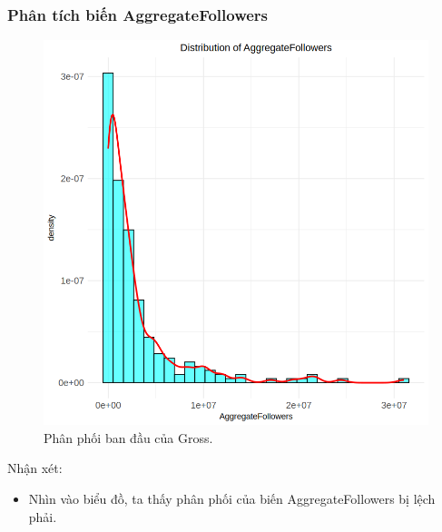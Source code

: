 \subsubsection{Phân tích biến AggregateFollowers}

\begin{figure}[H]
    \centering
    \includegraphics[width=0.75\columnwidth]{csm_figures/af_original_distribution.png}
    \caption{Phân phối ban đầu của Gross.}
    \label{fig:af_original_distribution}
\end{figure}
Nhận xét:
\begin{itemize}
    \item Nhìn vào biểu đồ, ta thấy phân phối của biến AggregateFollowers bị lệch phải.
\end{itemize}

